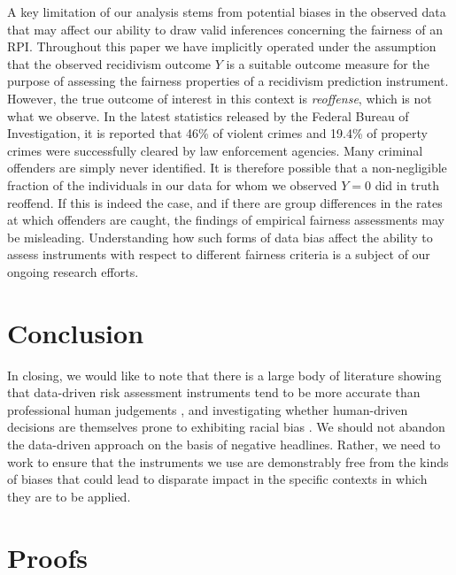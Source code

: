 \documentclass[11pt, svgnames]{article}
\numberwithin{equation}{section}
\theoremstyle{plain}
\theoremstyle{definition}
\numberwithin{prop}{section}
\numberwithin{corollary}{section}
\begin{document}
A key limitation of our analysis stems from potential biases in the observed data that may affect our ability to draw valid inferences concerning the fairness of an RPI.  Throughout this paper we have implicitly operated under the assumption that the observed recidivism outcome $Y$ is a suitable outcome measure for the purpose of assessing the fairness properties of a recidivism prediction instrument.  However, the true outcome of interest in this context is \emph{reoffense}, which is not what we observe.  In the latest statistics released by the Federal Bureau of Investigation\cite{fbi-clearance-2016}, it is reported that 46\% of violent crimes and 19.4\% of property crimes were successfully cleared by law enforcement agencies.  Many criminal offenders are simply never identified.  It is therefore possible that a non-negligible fraction of the individuals in our data for whom we observed $Y = 0$ did in truth reoffend.  If this is indeed the case, and if there are group differences in the rates at which offenders are caught, the findings of empirical fairness assessments may be misleading.  Understanding how such forms of data bias affect the ability to assess instruments with respect to different fairness criteria is a subject of our ongoing research efforts.



\section{Conclusion}

In closing, we would like to note that there is a large body of literature showing that data-driven risk assessment instruments tend to be more accurate than professional human judgements \citep{meehl1954clinical, grove2000clinical}, and investigating whether human-driven decisions are themselves prone to exhibiting racial bias \citep{anwar2012testing, sweeney1992influence}.  We should not abandon the data-driven approach on the basis of negative headlines.  Rather, we need to work to ensure that the instruments we use are demonstrably free from the kinds of biases that could lead to disparate impact in the specific contexts in which they are to be applied.  
   
 
\appendix 

\section{Proofs} \label{appendix:proofs}
\end{document}
